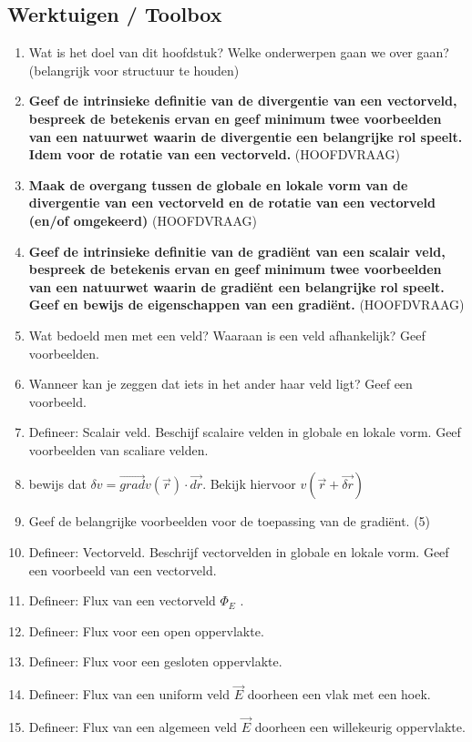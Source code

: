 \documentclass[12pt]{article}
\begin{document}
    \subsection{Werktuigen / Toolbox}
    \begin{enumerate}
        \item Wat is het doel van dit hoofdstuk? Welke onderwerpen gaan we over gaan? (belangrijk voor structuur te houden)
        \item \textbf{Geef de intrinsieke definitie van de divergentie van een vectorveld, bespreek de betekenis ervan en geef minimum twee voorbeelden van een natuurwet waarin de divergentie een belangrijke rol speelt. Idem voor de rotatie van een vectorveld.} (HOOFDVRAAG)
        \item \textbf{Maak de overgang tussen de globale en lokale vorm van de divergentie van een vectorveld en de rotatie van een vectorveld (en/of omgekeerd)} (HOOFDVRAAG)
        \item \textbf{Geef de intrinsieke definitie van de gradiënt van een scalair veld, bespreek de betekenis ervan en geef minimum twee voorbeelden van een natuurwet waarin de gradiënt een belangrijke rol speelt. Geef en bewijs de eigenschappen van een gradiënt.} (HOOFDVRAAG)
        \item Wat bedoeld men met een veld? Waaraan is een veld afhankelijk? Geef voorbeelden.
        \item Wanneer kan je zeggen dat iets in het ander haar veld ligt? Geef een voorbeeld.
        \item Defineer: Scalair veld. Beschijf scalaire velden in globale en lokale vorm. Geef voorbeelden van scaliare velden.
        \item bewijs dat $\delta v = \vec{grad}v(\vec{r}) \cdot \vec{dr}$. Bekijk hiervoor $v(\vec{r} + \vec{\delta r})$
        \item Geef de belangrijke voorbeelden voor de toepassing van de gradiënt. (5)
        \item Defineer: Vectorveld. Beschrijf vectorvelden in globale en lokale vorm. Geef een voorbeeld van een vectorveld.
        \item Defineer: Flux van een vectorveld $\Phi_E$ .
        \item Defineer: Flux voor een open oppervlakte.
        \item Defineer: Flux voor een gesloten oppervlakte.
        \item Defineer: Flux van een uniform veld $\vec{E}$ doorheen een vlak met een hoek.
        \item Defineer: Flux van een algemeen veld $\vec{E}$ doorheen een willekeurig oppervlakte.

\end{enumerate}
\end{document}
